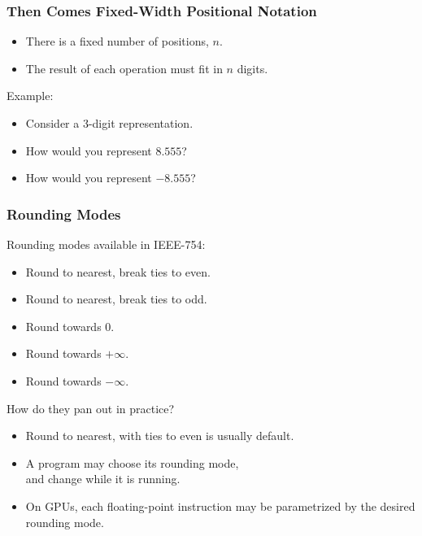 \begin{frame}

\frametitle{Then Comes Fixed-Width Positional Notation}

\begin{itemize}

\item There is a fixed number of positions, $n$.

\item The result of each operation must fit in $n$ digits.

\end{itemize}

\vspace{\fill}

Example:

\begin{itemize}

\item Consider a 3-digit representation.

\item How would you represent $8.555$?

\item How would you represent $-8.555$?

\end{itemize}

\end{frame}

\begin{frame}

\frametitle{Rounding Modes}

Rounding modes available in IEEE-754:

\begin{itemize}

\item Round to nearest, break ties to even.

\item Round to nearest, break ties to odd.

\item Round towards $0$.

\item Round towards $+\infty$.

\item Round towards $-\infty$.

\end{itemize}

How do they pan out in practice?

\begin{itemize}

\item Round to nearest, with ties to even is usually default.

\item A program may choose its rounding mode, \\ and change while it is
running.

\item On GPUs, each floating-point instruction may be parametrized by the
desired rounding mode.

\end{itemize}

\end{frame}
